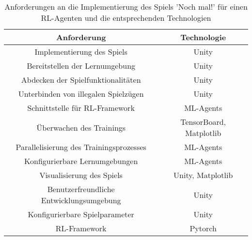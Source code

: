 \begin{table}[!h]
    \centering
    \label{tab:solveRequirements}
    \begin{tabular}{|c|c|}
    \hline
    \textbf{Anforderung} & \textbf{Technologie} \\
    \hline
    Implementierung des Spiels & Unity \\
    \hline
    Bereitstellen der Lernumgebung & Unity \\
    \hline
    Abdecken der Spielfunktionalitäten & Unity \\
    \hline
    Unterbinden von illegalen Spielzügen & Unity \\
    \hline
    Schnittstelle für RL-Framework & ML-Agents \\
    \hline
    Überwachen des Trainings & TensorBoard, Matplotlib \\
    \hline
    Parallelisierung des Trainingsprozesses & ML-Agents \\
    \hline
    Konfigurierbare Lernumgebungen & ML-Agents \\
    \hline
    Visualisierung des Spiels & Unity, Matplotlib \\
    \hline
    Benutzerfreundliche Entwicklungsumgebung & Unity \\
    \hline
    Konfigurierbare Spielparameter & Unity \\
    \hline
    RL-Framework & Pytorch \\
    \hline
    \end{tabular}
    \caption{Anforderungen an die Implementierung des Spiels 'Noch mal!' für einen RL-Agenten und die entsprechenden Technologien}
\end{table}



